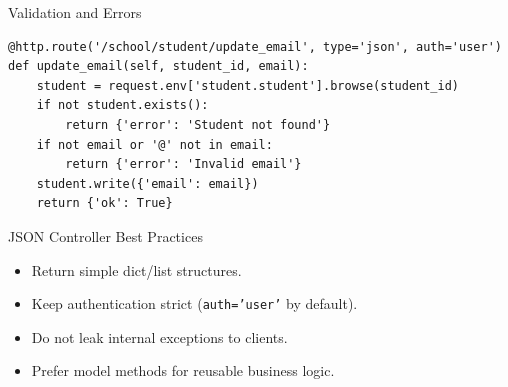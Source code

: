 \begin{frame}[fragile]{Validation and Errors}
\begin{lstlisting}
@http.route('/school/student/update_email', type='json', auth='user')
def update_email(self, student_id, email):
	student = request.env['student.student'].browse(student_id)
	if not student.exists():
		return {'error': 'Student not found'}
	if not email or '@' not in email:
		return {'error': 'Invalid email'}
	student.write({'email': email})
	return {'ok': True}
\end{lstlisting}
\end{frame}

\begin{frame}{JSON Controller Best Practices}
	\begin{itemize}
		\item Return simple dict/list structures.
		\item Keep authentication strict (\texttt{auth='user'} by default).
		\item Do not leak internal exceptions to clients.
		\item Prefer model methods for reusable business logic.
	\end{itemize}
\end{frame}
